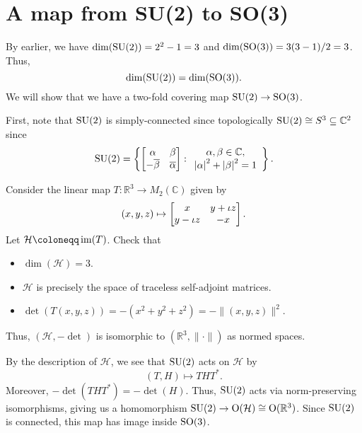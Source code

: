\documentclass[12pt]{article}
\begin{document}
\section{A map from SU(2) to SO(3)}

By earlier, we have $\dim(\operatorname{SU}(2)) = 2^{2} - 1 = 3$ and $\dim(\operatorname{SO}(3)) = 3(3 - 1)/2 = 3$. 
Thus,
\begin{equation*} 
	\dim(\operatorname{SU}(2)) = \dim(\operatorname{SO}(3)).
\end{equation*}
We will show that we have a two-fold covering map $\operatorname{SU}(2) \to \operatorname{SO}(3)$. 

First, note that $\operatorname{SU}(2)$ is simply-connected since topologically $\operatorname{SU}(2) \cong S^{3} \subseteq \mathbb{C}^{2}$ since
\begin{equation*} 
	\operatorname{SU}(2) = 
	\left\{\begin{bmatrix} \alpha & \beta \\ -\overline{\beta} & \overline{\alpha} \end{bmatrix} : 
	\begin{array}{c}
	\alpha, \beta \in \mathbb{C}, \\ 
	{\left\lvert \alpha \right\lvert}^{2} + {\left\lvert \beta \right\lvert}^{2} = 1
	\end{array}
	\right\}.
\end{equation*}

Consider the linear map $T : \mathbb{R}^{3} \to M_{2}(\mathbb{C})$ given by
\begin{equation*} 
	(x, y, z) \mapsto \begin{bmatrix} x & y + \iota z \\ y - \iota z & -x \end{bmatrix}.
\end{equation*}
Let $\mathcal{H} \coloneqq \im(T)$. Check that
\begin{itemize}
	\item $\dim(\mathcal{H}) = 3$.
	\item $\mathcal{H}$ is precisely the space of traceless self-adjoint matrices.
	\item $\det(T(x, y, z)) = -(x^{2} + y^{2} + z^{2}) = -\|(x, y, z)\|^{2}$.
\end{itemize}
Thus, $(\mathcal{H}, -\det)$ is isomorphic to $(\mathbb{R}^{3}, \|\cdot\|)$ as normed spaces.

By the description of $\mathcal{H}$, we see that $\operatorname{SU}(2)$ acts on $\mathcal{H}$ by
\begin{equation*} 
	(T, H) \mapsto THT^{\ast}.
\end{equation*}
Moreover, $-\det(THT^{\ast}) = -\det(H)$. 
Thus, $\operatorname{SU}(2)$ acts via norm-preserving isomorphisms, giving us a homomorphism $\operatorname{SU}(2) \to \operatorname{O}(\mathcal{H}) \cong \operatorname{O}(\mathbb{R}^{3})$. 
Since $\operatorname{SU}(2)$ is connected, this map has image inside $\operatorname{SO}(3)$.
\end{document}
